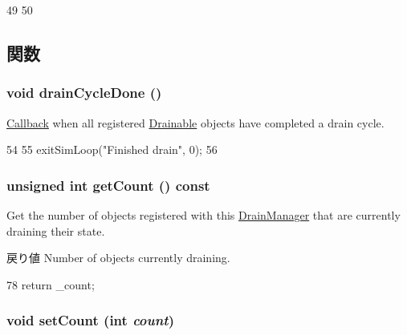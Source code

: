 \begin{DoxyCode}
49 {
50 }
\end{DoxyCode}


\subsection{関数}
\hypertarget{classDrainManager_ac5e51d21241b750913609915d78e7dcc}{
\subsubsection[{drainCycleDone}]{\setlength{\rightskip}{0pt plus 5cm}void drainCycleDone ()}}
\label{classDrainManager_ac5e51d21241b750913609915d78e7dcc}
\hyperlink{classCallback}{Callback} when all registered \hyperlink{classDrainable}{Drainable} objects have completed a drain cycle. 


\begin{DoxyCode}
54 {
55     exitSimLoop("Finished drain", 0);
56 }
\end{DoxyCode}
\hypertarget{classDrainManager_ab5eefd157f1a652223437e06c6148169}{
\subsubsection[{getCount}]{\setlength{\rightskip}{0pt plus 5cm}unsigned int getCount () const}}
\label{classDrainManager_ab5eefd157f1a652223437e06c6148169}
Get the number of objects registered with this \hyperlink{classDrainManager}{DrainManager} that are currently draining their state.

\begin{DoxyReturn}{戻り値}
Number of objects currently draining. 
\end{DoxyReturn}



\begin{DoxyCode}
78 { return _count; }
\end{DoxyCode}
\hypertarget{classDrainManager_a768ed4108d4a470957ab9bffef1f9181}{
\subsubsection[{setCount}]{\setlength{\rightskip}{0pt plus 5cm}void setCount (int {\em count})}}
\label{classDrainManager_a768ed4108d4a470957ab9bffef1f9181}



